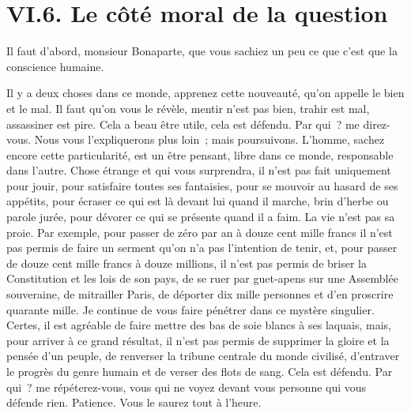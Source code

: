 \documentclass[french,twoside]{book} %
\begin{document}
\section[{VI.6. Le côté moral de la question}]{VI.6. Le côté moral de la question}

\noindent Il faut d’abord, monsieur Bonaparte, que vous sachiez un peu ce que c’est que la conscience humaine.\par
Il y a deux choses dans ce monde, apprenez cette nouveauté, qu’on appelle le bien et le mal. Il faut qu’on vous le révèle, mentir n’est pas bien, trahir est mal, assassiner est pire. Cela a beau être utile, cela est défendu. Par qui ? me direz-vous. Nous vous l’expliquerons plus loin ; mais poursuivons. L’homme, sachez encore cette particularité, est un être pensant, libre dans ce monde, responsable dans l’autre. Chose étrange et qui vous surprendra, il n’est pas fait uniquement pour jouir, pour satisfaire toutes ses fantaisies, pour se mouvoir au hasard de ses appétits, pour écraser ce qui est là devant lui quand il marche, brin d’herbe ou parole jurée, pour dévorer ce qui se présente quand il a faim. La vie n’est pas sa proie. Par exemple, pour passer de zéro par an à douze cent mille francs il n’est pas permis de faire un serment qu’on n’a pas l’intention de tenir, et, pour passer de douze cent mille francs à douze millions, il n’est pas permis de briser la Constitution et les lois de son pays, de se ruer par guet-apens sur une Assemblée souveraine, de mitrailler Paris, de déporter dix mille personnes et d’en proscrire quarante mille. Je continue de vous faire pénétrer dans ce mystère singulier. Certes, il est agréable de faire mettre des bas de soie blancs à ses laquais, mais, pour arriver à ce grand résultat, il n’est pas permis de supprimer la gloire et la pensée d’un peuple, de renverser la tribune centrale du monde civilisé, d’entraver le progrès du genre humain et de verser des flots de sang. Cela est défendu. Par qui ? me répéterez-vous, vous qui ne voyez devant vous personne qui vous défende rien. Patience. Vous le saurez tout à l’heure.\par
\end{document}
